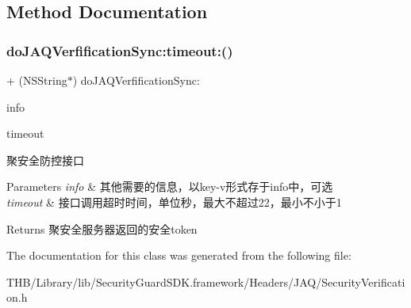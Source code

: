 \subsection{Method Documentation}
\mbox{\label{interface_security_verification_ad3ffbcd5e2921b79663ef2fa6fddf524}} 
\subsubsection{\texorpdfstring{do\+J\+A\+Q\+Verfification\+Sync\+:timeout\+:()}{doJAQVerfificationSync:timeout:()}}
{\footnotesize\ttfamily + (N\+S\+String$\ast$) do\+J\+A\+Q\+Verfification\+Sync\+: \begin{DoxyParamCaption}\item[{(N\+S\+Dictionary $\ast$)}]{info }\item[{timeout:(N\+S\+Integer)}]{timeout }\end{DoxyParamCaption}}

聚安全防控接口


\begin{DoxyParams}{Parameters}
{\em info} & 其他需要的信息，以key-\/v形式存于info中，可选 \\
\hline
{\em timeout} & 接口调用超时时间，单位秒，最大不超过22，最小不小于1\\
\hline
\end{DoxyParams}
\begin{DoxyReturn}{Returns}
聚安全服务器返回的安全token 
\end{DoxyReturn}


The documentation for this class was generated from the following file\+:\begin{DoxyCompactItemize}
\item 
T\+H\+B/\+Library/lib/\+Security\+Guard\+S\+D\+K.\+framework/\+Headers/\+J\+A\+Q/Security\+Verification.\+h\end{DoxyCompactItemize}

